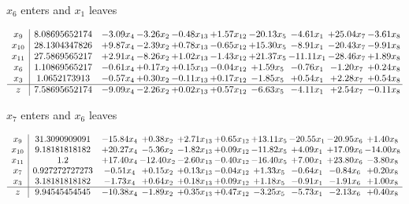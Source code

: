 \documentclass[9pt]{article}
\begin{document}
 $ x_{6} $ enters and $ x_{1} $ leaves 

 \[\begin{array}{c| c c@{\hskip 2pt} c@{\hskip 2pt} c@{\hskip 2pt} c@{\hskip 2pt} c@{\hskip 2pt} c@{\hskip 2pt} c@{\hskip 2pt} c@{\hskip 2pt} }
 x_{9}   &  8.08695652174 & -3.09 x_{4} & -3.26 x_{2} & -0.48 x_{13} & +  1.57 x_{12} & -20.13 x_{5} & -4.61 x_{1} & + 25.04 x_{7} & -3.61 x_{8}\\
 x_{10}   &  28.1304347826 & +  9.87 x_{4} & -2.39 x_{2} & +  0.78 x_{13} & -0.65 x_{12} & + 15.30 x_{5} & -8.91 x_{1} & -20.43 x_{7} & -9.91 x_{8}\\
 x_{11}   &  27.5869565217 & +  2.91 x_{4} & -8.26 x_{2} & +  1.02 x_{13} & -1.43 x_{12} & + 21.37 x_{5} & -11.11 x_{1} & -28.46 x_{7} & +  1.89 x_{8}\\
 x_{6}   &  1.10869565217 & -0.61 x_{4} & +  0.17 x_{2} & +  0.15 x_{13} & -0.04 x_{12} & +  1.59 x_{5} & -0.76 x_{1} & -1.20 x_{7} & +  0.24 x_{8}\\
 x_{3}   &  1.0652173913 & -0.57 x_{4} & +  0.30 x_{2} & -0.11 x_{13} & +  0.17 x_{12} & -1.85 x_{5} & +  0.54 x_{1} & +  2.28 x_{7} & +  0.54 x_{8}\\
\hline
z    &  7.58695652174 & -9.09 x_{4} & -2.26 x_{2} & +  0.02 x_{13} & +  0.57 x_{12} & -6.63 x_{5} & -4.11 x_{1} & +  2.54 x_{7} & -0.11 x_{8}\\
\end{array}\]


 $ x_{7} $ enters and $ x_{6} $ leaves 

 \[\begin{array}{c| c c@{\hskip 2pt} c@{\hskip 2pt} c@{\hskip 2pt} c@{\hskip 2pt} c@{\hskip 2pt} c@{\hskip 2pt} c@{\hskip 2pt} c@{\hskip 2pt} }
 x_{9}   &  31.3090909091 & -15.84 x_{4} & +  0.38 x_{2} & +  2.71 x_{13} & +  0.65 x_{12} & + 13.11 x_{5} & -20.55 x_{1} & -20.95 x_{6} & +  1.40 x_{8}\\
 x_{10}   &  9.18181818182 & + 20.27 x_{4} & -5.36 x_{2} & -1.82 x_{13} & +  0.09 x_{12} & -11.82 x_{5} & +  4.09 x_{1} & + 17.09 x_{6} & -14.00 x_{8}\\
 x_{11}   &  1.2 & + 17.40 x_{4} & -12.40 x_{2} & -2.60 x_{13} & -0.40 x_{12} & -16.40 x_{5} & +  7.00 x_{1} & + 23.80 x_{6} & -3.80 x_{8}\\
 x_{7}   &  0.927272727273 & -0.51 x_{4} & +  0.15 x_{2} & +  0.13 x_{13} & -0.04 x_{12} & +  1.33 x_{5} & -0.64 x_{1} & -0.84 x_{6} & +  0.20 x_{8}\\
 x_{3}   &  3.18181818182 & -1.73 x_{4} & +  0.64 x_{2} & +  0.18 x_{13} & +  0.09 x_{12} & +  1.18 x_{5} & -0.91 x_{1} & -1.91 x_{6} & +  1.00 x_{8}\\
\hline
z    &  9.94545454545 & -10.38 x_{4} & -1.89 x_{2} & +  0.35 x_{13} & +  0.47 x_{12} & -3.25 x_{5} & -5.73 x_{1} & -2.13 x_{6} & +  0.40 x_{8}\\
\end{array}\]
\end{document}
